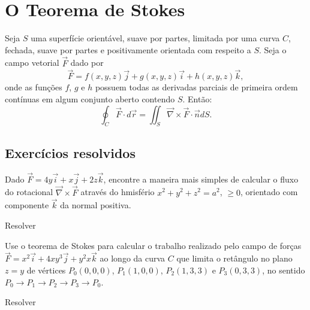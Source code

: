 \section{O Teorema de Stokes}

\begin{teo}
Seja $S$ uma superfície orientável, suave por partes, limitada por uma curva $C$, fechada, suave por partes e positivamente orientada com respeito a $S$. Seja o campo vetorial $\vec{F}$ dado por
$$
\vec{F}=f(x,y,z)\vec{j}+g(x,y,z)\vec{i}+h(x,y,z)\vec{k},
$$
onde as funções $f$, $g$ e $h$ possuem todas as derivadas parciais de primeira ordem contínuas em algum conjunto aberto contendo $S$. Então:
$$
\oint_C \vec{F}\cdot d \vec{r}=\iint_S \vec{\nabla}\times \vec{F}\cdot \vec{n} dS.
$$
\end{teo}

\subsection{Exercícios resolvidos}
\begin{exeresol}
 Dado $\vec{F}=4y\vec{i}+x\vec{j}+2z\vec{k}$, encontre a maneira mais simples de calcular o fluxo do rotacional $\vec{\nabla}\times\vec{F}$ através do hmisfério $x^2+y^2+z^2=a^2$, $\geq 0$, orientado com componente $\vec{k}$ da normal positiva.
\end{exeresol}
\begin{resol}
 Resolver
\end{resol}
\begin{exeresol}
Use o teorema de Stokes para calcular o trabalho realizado pelo campo de forças $\vec{F}=x^2\vec{i}+4xy^3\vec{j}+y^2x\vec{k}$ ao longo da curva $C$ que limita o retângulo no plano $z=y$ de vértices $P_0(0,0,0)$, $P_1(1,0,0)$, $P_2(1,3,3)$ e $P_3(0,3,3)$, no sentido $P_0\to P_1\to P_2\to P_3\to P_0$.
\end{exeresol}
\begin{resol}
 Resolver
\end{resol}


